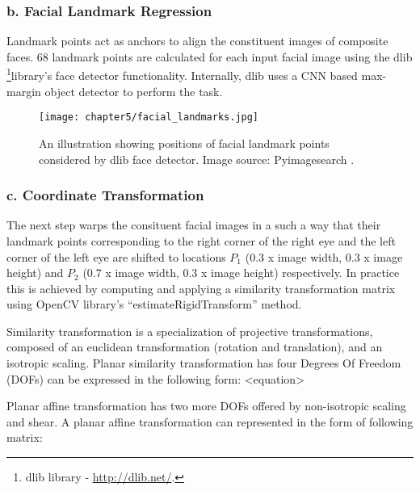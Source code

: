 \documentclass[../report.tex]{subfiles}
\begin{document}
    \subsubsection{b. Facial Landmark Regression}
    Landmark points act as anchors to align the constituent images of composite faces. 68 landmark points are calculated for each input facial image using the dlib \footnote{dlib library - \url{http://dlib.net/}.}library's face detector functionality. Internally, dlib uses a CNN based max-margin object detector to perform the task.
        \begin{figure}[H]
        \centering
    	\hspace*{0cm}      
    	\texttt{[image: chapter5/facial\_landmarks.jpg]}
    	\caption{An illustration showing positions of facial landmark points considered by dlib face detector. Image source: Pyimagesearch \protect\footnotemark.}
    	\label{fig_gm_pipeline}
    \end{figure}
    \subsubsection{c. Coordinate Transformation}
    The next step warps the consituent facial images in a such a way that their landmark points corresponding to the right corner of the right eye and the left corner of the left eye are shifted to locations $P_{1}$ (0.3 x image width, 0.3 x image height) and $P_{2}$ (0.7 x image width, 0.3 x image height) respectively. In practice this is achieved by computing and applying a similarity transformation matrix using OpenCV library's \enquote{estimateRigidTransform} method.
    
    Similarity transformation \cite{hartley2003multiple} is a specialization of projective transformations, composed of an euclidean transformation (rotation and translation), and an isotropic scaling. Planar similarity transformation has four Degrees Of Freedom (DOFs) can be expressed in the following form:
    <equation>
    
    Planar affine transformation has two more DOFs offered by non-isotropic scaling and shear. A planar affine transformation can represented in the form of following matrix:
    
\end{document}
